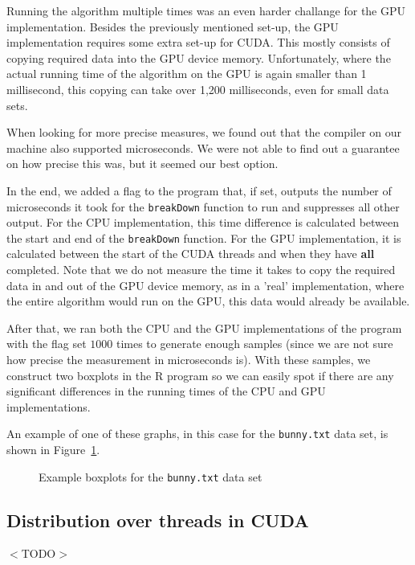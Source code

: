 Running the algorithm multiple times was an even harder challange for the GPU implementation.
Besides the previously mentioned set-up, the GPU implementation requires some extra set-up for CUDA.
This mostly consists of copying required data into the GPU device memory.
Unfortunately, where the actual running time of the algorithm on the GPU is again smaller than 1 millisecond, this copying can take over 1,200 milliseconds, even for small data sets.

When looking for more precise measures, we found out that the compiler on our machine also supported microseconds.
We were not able to find out a guarantee on how precise this was, but it seemed our best option.

In the end, we added a flag to the program that, if set, outputs the number of microseconds it took for the \texttt{breakDown} function to run and suppresses all other output.
For the CPU implementation, this time difference is calculated between the start and end of the \texttt{breakDown} function.
For the GPU implementation, it is calculated between the start of the CUDA threads and when they have \textbf{all} completed.
Note that we do not measure the time it takes to copy the required data in and out of the GPU device memory, as in a 'real' implementation, where the entire algorithm would run on the GPU, this data would already be available.

After that, we ran both the CPU and the GPU implementations of the program with the flag set $1000$ times to generate enough samples (since we are not sure how precise the measurement in microseconds is).
With these samples, we construct two boxplots in the R program so we can easily spot if there are any significant differences in the running times of the CPU and GPU implementations.

An example of one of these graphs, in this case for the \texttt{bunny.txt} data set, is shown in Figure~\ref{fig:bunny_box}.

\begin{figure}
	\caption{Example boxplots for the \texttt{bunny.txt} data set}
	\label{fig:bunny_box}
\end{figure}

\subsection{Distribution over threads in CUDA}
$<$TODO$>$
